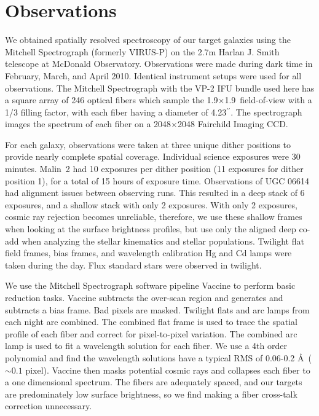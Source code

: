 \documentclass{emulateapj}
\def\arcsec{$^{\prime\prime}$}
\begin{document}

\section{Observations}\label{sec:obs}

We obtained spatially resolved spectroscopy of our target galaxies using the Mitchell Spectrograph (formerly VIRUS-P)\citep{Hill08} on the 2.7m Harlan J. Smith telescope at McDonald Observatory.  Observations were made during dark time in February, March, and April 2010.  Identical instrument setups were used for all observations.  The Mitchell Spectrograph with the VP-2 IFU bundle used here has a square array of 246 optical fibers which sample the 1.9\arcmin$\times$1.9\arcmin\ field-of-view with a 1/3 filling factor, with each fiber having a diameter of 4.23\arcsec.  The spectrograph images the spectrum of each fiber on a 2048$\times$2048 Fairchild Imaging CCD.  

For each galaxy, observations were taken at three unique dither positions to provide nearly complete spatial coverage.  Individual science exposures were 30 minutes.  Malin~2 had 10 exposures per dither position (11 exposures for dither position 1), for a total of 15 hours of exposure time.  Observations of UGC 06614 had alignment issues between observing runs.  This resulted in a deep stack of 6 exposures, and a shallow stack with only 2 exposures.  With only 2 exposures, cosmic ray rejection becomes unreliable, therefore, we use these shallow frames when looking at the surface brightness profiles, but use only the aligned deep co-add when analyzing the stellar kinematics and stellar populations. Twilight flat field frames, bias frames, and wavelength calibration Hg and Cd lamps were taken during the day.  Flux standard stars were observed in twilight.  


We use the Mitchell Spectrograph software pipeline Vaccine \citep{Adams2011} to perform basic reduction tasks.  Vaccine subtracts the over-scan region and generates and subtracts a bias frame.  Bad pixels are masked.  Twilight flats and arc lamps from each night are combined.  The combined flat frame is used to trace the spatial profile of each fiber and correct for pixel-to-pixel variation.  The combined arc lamp is used to fit a wavelength solution for each fiber.  We use a 4th order polynomial and find the wavelength solutions have a typical RMS of 0.06-0.2 \AA\ ($\sim0.1$ pixel).  Vaccine then masks potential cosmic rays and collapses each fiber to a one dimensional spectrum.  The fibers are adequately spaced, and our targets are predominately low surface brightness, so we find making a fiber cross-talk correction unnecessary.
\end{document}

